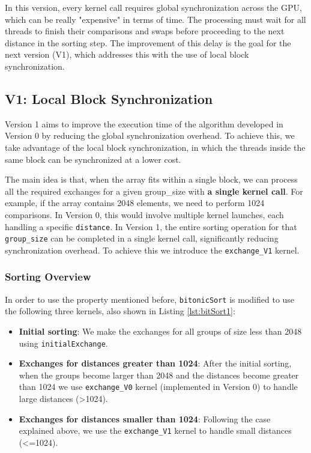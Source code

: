 \documentclass[a4paper,12pt]{article}
\begin{document}
In this version, every kernel call requires global synchronization across the GPU, which can be really "expensive" in terms of time. The processing must wait for all threads to finish their comparisons and swaps before proceeding to the next distance in the sorting step. The improvement of this delay is the goal for the next version (V1), which addresses this with the use of local block synchronization.

\subsection{V1: Local Block Synchronization}

Version 1 aims to improve the execution time of the algorithm developed in Version 0 by reducing the global synchronization overhead. To achieve this, we take advantage of the local block synchronization, in which the threads inside the same block can be synchronized at a lower cost. 

The main idea is that, when the array fits within a single block, we can process all the required exchanges for a given group\_size with \textbf{a single kernel call}. For example, if the array contains 2048 elements, we need to perform 1024 comparisons. In Version 0, this would involve multiple kernel launches, each handling a specific \texttt{distance}. In Version 1, the entire sorting operation for that \texttt{group\_size} can be completed in a single kernel call, significantly reducing synchronization overhead. To achieve this we introduce the \texttt{exchange\_V1} kernel. 

\subsubsection*{Sorting Overview}
In order to use the property mentioned before, \texttt{bitonicSort} is modified to use the following three kernels, also shown in Listing \ref{lst:bitSort1}:

\begin{itemize}
    \item \textbf{Initial sorting}: We make the exchanges for all groups of size less than 2048 using \texttt{initialExchange}. 
    \item \textbf{Exchanges for distances greater than 1024}: After the initial sorting, when the groups become larger than 2048 and the distances become greater than 1024 we use \texttt{exchange\_V0} kernel (implemented in Version 0) to handle large distances (>1024).
    \item \textbf{Exchanges for distances smaller than 1024}: Following the case explained above, we use the \texttt{exchange\_V1} kernel to handle small distances (<=1024).
    
\end{itemize}
\end{document}
